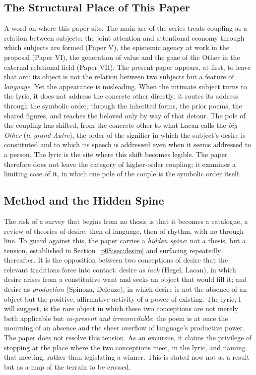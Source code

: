 \subsection{The Structural Place of This Paper}

A word on where this paper sits. The main arc of the series treats coupling as a relation between subjects: the joint attention and attentional economy through which subjects are formed (Paper V), the epistemic agency at work in the proposal (Paper VI), the generation of value and the gaze of the Other in the external relational field (Paper VII). The present paper appears, at first, to leave that arc: its object is not the relation between two subjects but a feature of \emph{language}. Yet the appearance is misleading. When the intimate subject turns to the lyric, it does not address the concrete other directly; it routes its address through the symbolic order, through the inherited forms, the prior poems, the shared figures, and reaches the beloved only by way of that detour. The pole of the coupling has shifted, from the concrete other to what Lacan calls the \textit{big Other} (\textit{le grand Autre}), the order of the signifier in which the subject's desire is constituted and to which its speech is addressed even when it seems addressed to a person. The lyric is the site where this shift becomes legible. The paper therefore does not leave the category of higher-order coupling; it examines a limiting case of it, in which one pole of the couple is the symbolic order itself.

\subsection{Method and the Hidden Spine}

The risk of a survey that begins from no thesis is that it becomes a catalogue, a review of theories of desire, then of language, then of rhythm, with no through-line. To guard against this, the paper carries a \emph{hidden spine}: not a thesis, but a tension, established in Section~\ref{p08:sec:desire} and surfacing repeatedly thereafter. It is the opposition between two conceptions of desire that the relevant traditions force into contact: desire as \emph{lack} (Hegel, Lacan), in which desire arises from a constitutive want and seeks an object that would fill it; and desire as \emph{production} (Spinoza, Deleuze), in which desire is not the absence of an object but the positive, affirmative activity of a power of existing. The lyric, I will suggest, is the rare object in which these two conceptions are not merely both applicable but \emph{co-present and irreconcilable}: the poem is at once the mourning of an absence and the sheer overflow of language's productive power. The paper does not resolve this tension. As an excursus, it claims the privilege of stopping at the place where the two conceptions meet, in the lyric, and naming that meeting, rather than legislating a winner. This is stated now not as a result but as a map of the terrain to be crossed.


